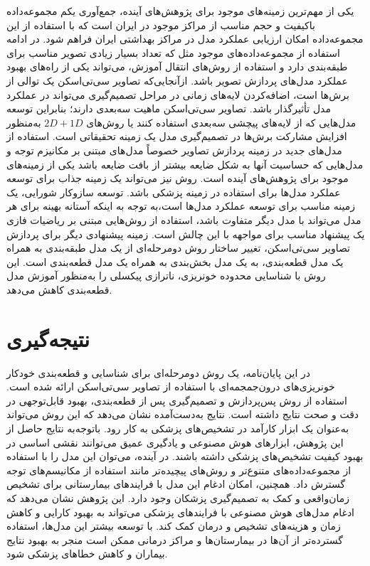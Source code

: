 یکی از مهم‌ترین زمینه‌های موجود برای پژوهش‌های آینده، جمع‌آوری یکم مجموعه‌داده باکیفیت و حجم مناسب از مراکز موجود در ایران است که با استفاده از این مجموعه‌داده امکان ارزیابی عملکرد مدل در مراکز بهداشتی ایران فراهم شود. در ادامه استفاده از مجموعه‌داده‌های موجود مثل
\cite{rsna_hemorrhage_detection_kaggle}
که تعداد بسیار زیادی تصویر مناسب برای طبقه‌بندی دارد و استفاده از روش‌های انتقال آموزش،‌ می‌تواند یکی از راه‌های بهبود عملکرد مدل‌های پردازش تصویر باشد. 
ازآنجایی‌که تصاویر سی‌تی‌اسکن یک توالی از برش‌ها است، اضافه‌کردن لایه‌های زمانی در مراحل تصمیم‌گیری می‌تواند در عملکرد مدل تأثیرگذار باشد. تصاویر سی‌تی‌اسکن ماهیت سه‌بعدی دارند؛ بنابراین توسعه مدل‌هایی که از لایه‌های پیچشی سه‌بعدی استفاده کنند یا روش‌های 
$2D+1D$
به‌منظور افزایش مشارکت برش‌ها در تصمیم‌گیری مدل یک زمینه تحقیقاتی است.
استفاده از مدل‌های جدید در زمینه پردازش تصاویر خصوصاً مدل‌های مبتنی بر مکانیزم 
توجه و مدل‌هایی که حساسیت آنها به شکل ضایعه بیشتر از بافت ضایعه باشد یکی از زمینه‌های موجود برای پژوهش‌های آینده است.
روش 
نیز می‌تواند یک زمینه جذاب برای توسعه عملکرد مدل‌ها برای استفاده در زمینه پزشکی باشد. 
توسعه سازوکار شورایی،‌ یک زمینه مناسب برای توسعه عملکرد مدل‌ها است،‌به توجه به اینکه آستانه بهینه برای هر مدل می‌تواند با مدل دیگر متفاوت باشد،‌ استفاده از روش‌هایی مبتنی بر ریاضیات فازی 
یک پیشنهاد مناسب برای مواجهه با این چالش است. زمینه پیشنهادی دیگر برای پردازش تصاویر سی‌تی‌اسکن، تغییر ساختار روش دومرحله‌ای از یک مدل طبقه‌بندی به همراه یک مدل قطعه‌بندی، به یک مدل بخش‌بندی به همراه یک مدل قطعه‌بندی است. این روش با شناسایی محدوده خونریزی، ناترازی پیکسلی را به‌منظور آموزش مدل قطعه‌بندی کاهش می‌دهد. 
 
\section{نتیجه‌گیری}
در این پایان‌نامه، یک روش دومرحله‌ای برای شناسایی و قطعه‌بندی خودکار خونریزی‌های درون‌جمجمه‌ای با استفاده از تصاویر سی‌تی‌اسکن ارائه شده است. استفاده از روش پس‌پردازش و تصمیم‌گیری پس از قطعه‌بندی، بهبود قابل‌توجهی در دقت و صحت نتایج داشته است. نتایج به‌دست‌آمده نشان می‌دهد که این روش می‌تواند به‌عنوان یک ابزار کارآمد در تشخیص‌های پزشکی به کار رود.
باتوجه‌به نتایج حاصل از این پژوهش، ابزار‌های هوش مصنوعی و یادگیری عمیق می‌توانند نقشی اساسی در بهبود کیفیت تشخیص‌های پزشکی داشته باشند. در آینده، می‌توان این مدل را با استفاده از مجموعه‌داده‌های متنوع‌تر و روش‌های پیچیده‌تر مانند استفاده از مکانیسم‌های توجه گسترش داد. همچنین، امکان ادغام این مدل با فرایند‌های بیمارستانی برای تشخیص زمان‌واقعی و کمک به تصمیم‌گیری پزشکان وجود دارد.
این پژوهش نشان می‌دهد که ادغام مدل‌های هوش مصنوعی با فرایند‌های پزشکی می‌تواند به بهبود کارایی و کاهش زمان و هزینه‌های تشخیص و درمان کمک کند. با توسعه بیشتر این مدل‌ها، استفاده گسترده‌تر از آن‌ها در بیمارستان‌ها و مراکز درمانی ممکن است منجر به بهبود نتایج بیماران و کاهش خطاهای پزشکی شود.
